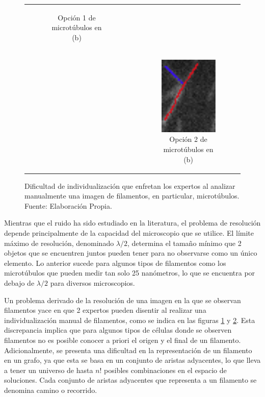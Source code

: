 \begin{figure}[h]
\begin{tabular}{c c c}
\begin{subfigure}[t]{0.21\textwidth}
        \caption{Opci\'on 1 de microt\'ubulos en (b)} %
        \label{fig:NoConsensoOpcion1}
        \end{subfigure} \\
        & &
        \begin{subfigure}[b]{0.21\textwidth}
        \includegraphics[scale=0.8]{imagenes/NoConsenso4.png}
        \caption{Opci\'on 2 de microt\'ubulos en (b)}
        \label{fig:NoConsensoOpcion2}
        \end{subfigure} \\
    \end{tabular}
    
    \caption{Dificultad de individualizaci\'on que enfretan los expertos al analizar manualmente una imagen de filamentos, en particular, microt\'ubulos. Fuente: Elaboraci\'on Propia.}
    \label{fig:NoConsenso}
\end{figure}

Mientras que el ruido ha sido estudiado en la literatura, el problema de resoluci\'on depende principalmente de la capacidad del microscopio que se utilice. El l\'imite m\'aximo de resoluci\'on, denominado $\lambda/2$, determina el tama\~no m\'inimo que 2 objetos que se encuentren juntos pueden tener para no observarse como un \'unico elemento. Lo anterior sucede para algunos tipos de filamentos como los microt\'ubulos que pueden medir tan solo 25 nan\'ometros, lo que se encuentra por debajo de $\lambda/2$ para diversos microscopios.


Un problema derivado de la resoluci\'on de una imagen en la que se observan filamentos yace en que 2 expertos pueden disentir al realizar una individualizaci\'on manual de filamentos, como se indica en las figuras \ref{fig:NoConsensoOpcion1} y \ref{fig:NoConsensoOpcion2}. Esta discrepancia implica que para algunos tipos de c\'elulas donde se observen filamentos no es posible conocer a priori el origen y el final de un filamento. Adicionalmente, se presenta una dificultad en la representaci\'on de un filamento en un grafo, ya que esta se basa en un conjunto de aristas adyacentes, lo que lleva a tener un universo de hasta $n!$ posibles combinaciones en el espacio de soluciones. Cada conjunto de aristas adyacentes que representa a un filamento se denomina camino o recorrido.


